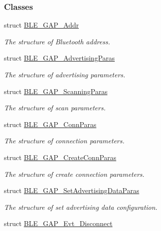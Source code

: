 \subsubsection*{Classes}
\begin{DoxyCompactItemize}
\item 
struct \hyperlink{struct_b_l_e___g_a_p___addr}{B\+L\+E\+\_\+\+G\+A\+P\+\_\+\+Addr}
\begin{DoxyCompactList}\small\item\em The structure of Bluetooth address. \end{DoxyCompactList}\item 
struct \hyperlink{struct_b_l_e___g_a_p___advertising_paras}{B\+L\+E\+\_\+\+G\+A\+P\+\_\+\+Advertising\+Paras}
\begin{DoxyCompactList}\small\item\em The structure of advertising parameters. \end{DoxyCompactList}\item 
struct \hyperlink{struct_b_l_e___g_a_p___scanning_paras}{B\+L\+E\+\_\+\+G\+A\+P\+\_\+\+Scanning\+Paras}
\begin{DoxyCompactList}\small\item\em The structure of scan parameters. \end{DoxyCompactList}\item 
struct \hyperlink{struct_b_l_e___g_a_p___conn_paras}{B\+L\+E\+\_\+\+G\+A\+P\+\_\+\+Conn\+Paras}
\begin{DoxyCompactList}\small\item\em The structure of connection parameters. \end{DoxyCompactList}\item 
struct \hyperlink{struct_b_l_e___g_a_p___create_conn_paras}{B\+L\+E\+\_\+\+G\+A\+P\+\_\+\+Create\+Conn\+Paras}
\begin{DoxyCompactList}\small\item\em The structure of create connection parameters. \end{DoxyCompactList}\item 
struct \hyperlink{struct_b_l_e___g_a_p___set_advertising_data_paras}{B\+L\+E\+\_\+\+G\+A\+P\+\_\+\+Set\+Advertising\+Data\+Paras}
\begin{DoxyCompactList}\small\item\em The structure of set advertising data configuration. \end{DoxyCompactList}\item 
struct \hyperlink{struct_b_l_e___g_a_p___evt___disconnect}{B\+L\+E\+\_\+\+G\+A\+P\+\_\+\+Evt\+\_\+\+Disconnect}

\end{DoxyCompactItemize}
